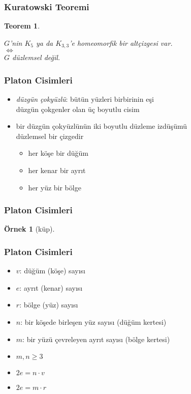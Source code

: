 \documentclass[dvipsnames]{beamer}
\theoremstyle{definition}
\theoremstyle{example}
\newtheorem{ornek}[theorem]{Örnek}
\theoremstyle{plain}
\newtheorem{teorem}[theorem]{Teorem}
\begin{document}
\begin{frame}
  \frametitle{Kuratowski Teoremi}

  \begin{teorem}
    \begin{center}
      $G$'nin $K_5$ ya da $K_{3,3}$'e homeomorfik bir altçizgesi var.\\
      $\Leftrightarrow$\\
      $G$ düzlemsel değil.
    \end{center}
  \end{teorem}
\end{frame}

\begin{frame}
  \frametitle{Platon Cisimleri}

  \begin{itemize}
    \item \emph{düzgün çokyüzlü}: bütün yüzleri birbirinin eşi\\
      düzgün çokgenler olan üç boyutlu cisim

    \pause
    \item bir düzgün çokyüzlünün iki boyutlu düzleme izdüşümü\\
      düzlemsel bir çizgedir
    \begin{itemize}
      \item her köşe bir düğüm
      \item her kenar bir ayrıt
      \item her yüz bir bölge
    \end{itemize}
  \end{itemize}
\end{frame}

\begin{frame}
  \frametitle{Platon Cisimleri}

  \begin{ornek}[küp]
    \begin{center}
    \end{center}
  \end{ornek}
\end{frame}

\begin{frame}
  \frametitle{Platon Cisimleri}

  \begin{itemize}
    \item $v$: düğüm (köşe) sayısı
    \item $e$: ayrıt (kenar) sayısı
    \item $r$: bölge (yüz) sayısı
    \item $n$: bir köşede birleşen yüz sayısı (düğüm kertesi)
    \item $m$: bir yüzü çevreleyen ayrıt sayısı (bölge kertesi)
  \end{itemize}

  \pause
  \begin{itemize}
    \item $m,n \geq 3$
    \item $2e = n \cdot v$
    \item $2e = m \cdot r$
  \end{itemize}
\end{frame}
\end{document}
